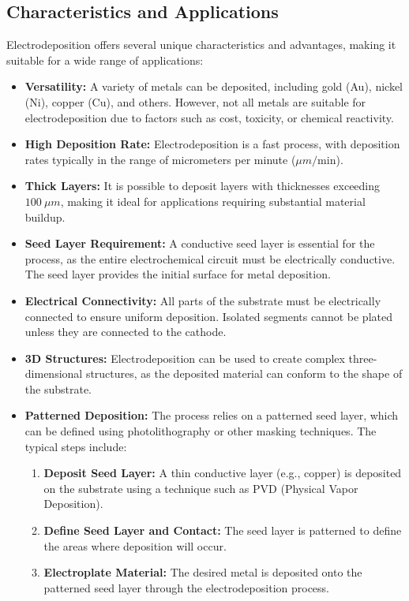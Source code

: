 \documentclass{report}
\begin{document}
\subsection{Characteristics and Applications}
Electrodeposition offers several unique characteristics and advantages, making it suitable for a wide range of applications:
\begin{itemize}
    \item \textbf{Versatility:} A variety of metals can be deposited, including gold (Au), nickel (Ni), copper (Cu), and others. However, not all metals are suitable for electrodeposition due to factors such as cost, toxicity, or chemical reactivity.
    \item \textbf{High Deposition Rate:} Electrodeposition is a fast process, with deposition rates typically in the range of micrometers per minute ($\mu m/\text{min}$).
    \item \textbf{Thick Layers:} It is possible to deposit layers with thicknesses exceeding $100~\mu m$, making it ideal for applications requiring substantial material buildup.
    \item \textbf{Seed Layer Requirement:} A conductive seed layer is essential for the process, as the entire electrochemical circuit must be electrically conductive. The seed layer provides the initial surface for metal deposition.
    \item \textbf{Electrical Connectivity:} All parts of the substrate must be electrically connected to ensure uniform deposition. Isolated segments cannot be plated unless they are connected to the cathode.
    \item \textbf{3D Structures:} Electrodeposition can be used to create complex three-dimensional structures, as the deposited material can conform to the shape of the substrate.
    \item \textbf{Patterned Deposition:} The process relies on a patterned seed layer, which can be defined using photolithography or other masking techniques. The typical steps include:
    \begin{enumerate}
        \item \textbf{Deposit Seed Layer:} A thin conductive layer (e.g., copper) is deposited on the substrate using a technique such as PVD (Physical Vapor Deposition).
        \item \textbf{Define Seed Layer and Contact:} The seed layer is patterned to define the areas where deposition will occur.
        \item \textbf{Electroplate Material:} The desired metal is deposited onto the patterned seed layer through the electrodeposition process.
    \end{enumerate}
\end{itemize}
\end{document}
